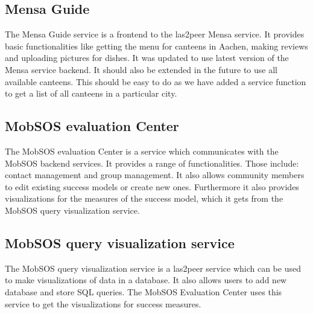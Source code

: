 \subsection{Mensa Guide}
The Mensa Guide service is a frontend to the las2peer Mensa service. It provides basic functionalities like getting the menu for canteens in Aachen, making reviews and uploading pictures for dishes. It was updated to use latest version of the Mensa service backend. It should also be extended in the future to use all available canteens. This should be easy to do as we have added a service function to get a list of all canteens in a particular city.

\subsection{MobSOS evaluation Center}
The MobSOS evaluation Center is a service which communicates with the MobSOS backend services. It provides a range of functionalities. Those include: contact management and group management. 
It also allows community members to edit existing success models or create new ones.
Furthermore it also provides visualizations for the measures of the success model, which it gets from the MobSOS query visualization service.

\subsection{MobSOS query visualization service}
The MobSOS query visualization service is a las2peer service which can be used to make visualizations of data in a database. It also allows users to add new database and store SQL queries. The MobSOS Evaluation Center uses this service to get the visualizations for success measures.




